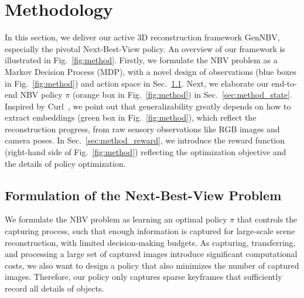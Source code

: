 \vspace{1pt}
\section{Methodology}
\label{sec:method}
    In this section, we deliver our active 3D reconstruction framework GenNBV, especially the pivotal Next-Best-View policy. An overview of our framework is illustrated in Fig.~\ref{fig:method}.
    Firstly, we formulate the NBV problem as a Markov Decision Process (MDP), with a novel design of observations (blue boxes in Fig.~\ref{fig:method}) and action space in Sec.~\ref{sec:method_setup}.
    Next, we elaborate our end-to-end NBV policy $\pi$ (orange box in  Fig.~\ref{fig:method}) in Sec.~\ref{sec:method_state}. Inspired by Curl~\citep{laskin2020curl}, we point out that generalizability greatly depends on how to extract embeddings (green box in Fig.~\ref{fig:method}), which reflect the reconstruction progress, from raw sensory observations like RGB images and camera poses.
    In Sec.~\ref{sec:method_reward}, we introduce the reward function (right-hand side of  Fig.~\ref{fig:method}) reflecting the optimization objective and the details of policy optimization.

\vspace{4pt}
\subsection{Formulation of the Next-Best-View Problem}
\label{sec:method_setup}
    We formulate the NBV problem as learning an optimal policy $\pi$ that controls the capturing process, such that enough information is captured for large-scale scene reconstruction, with limited decision-making budgets.
    As capturing, transferring, and processing a large set of captured images introduce significant computational costs, we also want to design a policy that also minimizes the number of captured images. Therefore, our policy only captures sparse keyframes that sufficiently record all details of objects.

